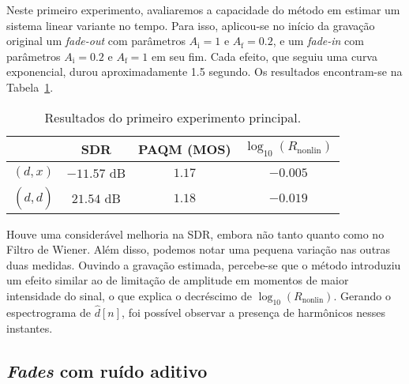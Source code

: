 Neste primeiro experimento, avaliaremos a capacidade do método em estimar um sistema
linear variante no tempo. Para isso, aplicou-se no início da gravação original um
\textit{fade-out} com parâmetros $A_\text{i} = 1$ e $A_\text{f} = 0.2$, e um
\textit{fade-in} com parâmetros $A_\text{i} = 0.2$ e $A_\text{f} = 1$ em seu fim. Cada
efeito, que seguiu uma curva exponencial, durou aproximadamente 1.5 segundo. Os
resultados encontram-se na Tabela~\ref{tab:correntropy:experiment-1}.
{\def\arraystretch{1.25}\tabcolsep=10pt
\begin{table}[!ht]
	\centering
	\caption[Resultados do primeiro experimento: \textit{fades}]{Resultados do primeiro experimento principal.}
	\label{tab:correntropy:experiment-1}
	\begin{tabular}{cccc}
		\toprule
		               & SDR         & PAQM (MOS) & $\log_{10}(R_{\text{nonlin}})$ \\
		\midrule
		$(d, x)$       & $-11.57$ dB & $1.17$     & $-0.005$                       \\
		$(d, \hat{d})$ & $21.54$ dB  & $1.18$     & $-0.019$                       \\ \bottomrule
	\end{tabular}
\end{table}
}

Houve uma considerável melhoria na SDR, embora não tanto quanto como no Filtro de
Wiener. Além disso, podemos notar uma pequena variação nas outras duas medidas. Ouvindo
a gravação estimada, percebe-se que o método introduziu um efeito similar ao de
limitação de amplitude em momentos de maior intensidade do sinal, o que explica o
decréscimo de $\log_{10}(R_{\text{nonlin}})$. Gerando o espectrograma de $\hat{d}[n]$,
foi possível observar a presença de harmônicos nesses instantes.

\subsection{\textit{Fades} com ruído aditivo}

